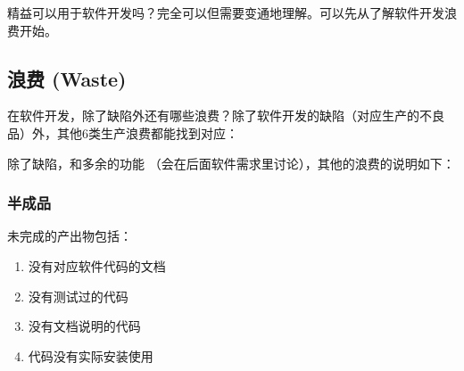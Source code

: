 \documentclass{book}        %
\providecommand{\tightlist}{%
  \setlength{\itemsep}{0pt}\setlength{\parskip}{0pt}}
\begin{document}
精益可以用于软件开发吗？完全可以但需要变通地理解。可以先从了解软件开发浪费开始。

\hypertarget{ux6d6aux8d39-waste}{%
\subsection{浪费 (Waste)}\label{ux6d6aux8d39-waste}}

在软件开发，除了缺陷外还有哪些浪费？除了软件开发的缺陷（对应生产的不良品）外，其他6类生产浪费都能找到对应：










除了缺陷，和多余的功能
（会在后面软件需求里讨论），其他的浪费的说明如下：

\hypertarget{ux534aux6210ux54c1}{%
\subsubsection{半成品}\label{ux534aux6210ux54c1}}

未完成的产出物包括：

\begin{enumerate}
\tightlist
\item
  没有对应软件代码的文档
\item
  没有测试过的代码
\item
  没有文档说明的代码
\item
  代码没有实际安装使用
\end{enumerate}
\end{document}
